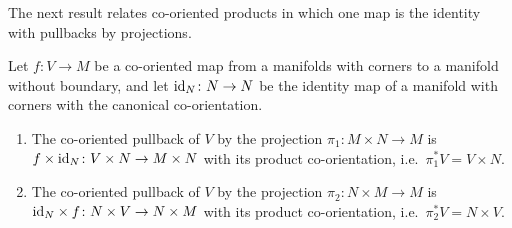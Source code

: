 The next result relates co-oriented products in which one map is the identity with pullbacks by projections.

\begin{proposition}\label{P: projection pullbacks}
	Let $f \colon V \to M$ be a co-oriented map from a manifolds with corners to a manifold without boundary, and let $\mathrm{id}_N \colon N \to N$ be the identity map of a manifold with corners with the canonical co-orientation.

	\begin{enumerate}
		\item The co-oriented pullback of $V$ by the projection $\pi_1 \colon M \times N \to M$ is $f \times \mathrm{id}_N \colon V \times N \to M \times N$ with its product co-orientation, i.e.\ $\pi_1^*V = V \times N$.

		\item The co-oriented pullback of $V$ by the projection $\pi_2 \colon N \times M \to M$ is $\mathrm{id}_N \times f \colon N \times V \to N \times M$ with its product co-orientation, i.e.\ $\pi_2^*V = N \times V$.
	\end{enumerate}
\end{proposition}
